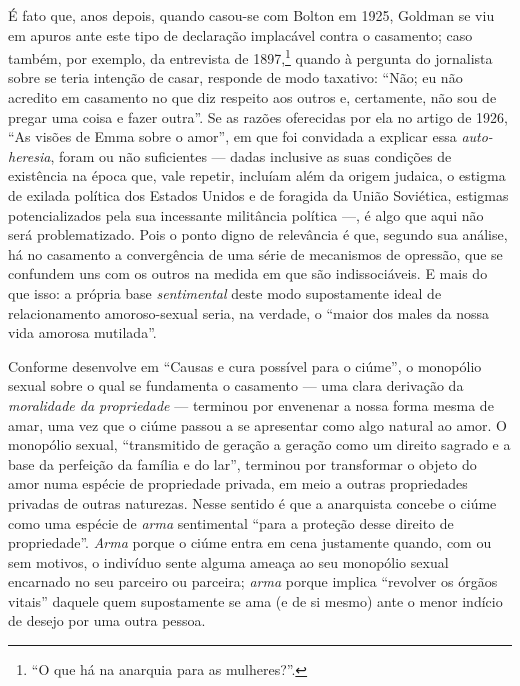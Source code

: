 É fato que, anos depois, quando casou-se com Bolton em 1925, Goldman
se viu em apuros ante este tipo de declaração implacável contra o
casamento; caso também, por exemplo, da entrevista de 1897,\footnote{``O que há
na anarquia para as mulheres?''.} quando à pergunta do jornalista sobre
se teria intenção de casar, responde de modo taxativo: ``Não; eu não
acredito em casamento no que diz respeito aos outros e, certamente, não
sou de pregar uma coisa e fazer outra''. Se as razões oferecidas por
ela no artigo de 1926, ``As visões de Emma sobre o amor'',
em que foi convidada a explicar essa \textit{auto-heresia}, foram ou não
suficientes --- dadas inclusive as suas condições de existência na época
que, vale repetir, incluíam além da origem judaica, o estigma de exilada
política dos Estados Unidos e de foragida da União Soviética,
estigmas potencializados pela sua incessante militância política ---, é
algo que aqui não será problematizado. Pois o ponto
digno de relevância é que, segundo sua análise, há no
casamento a convergência de uma série de mecanismos de opressão, que se
confundem uns com os outros na medida em que são indissociáveis. E mais
do que isso: a própria base \textit{sentimental} deste modo supostamente
ideal de relacionamento amoroso-sexual seria, na verdade, o ``maior dos
males da nossa vida amorosa mutilada''.

Conforme desenvolve em ``Causas e cura possível para o ciúme'', o
monopólio sexual sobre o qual se fundamenta o casamento --- uma clara
derivação da \textit{moralidade da propriedade} --- terminou por envenenar a
nossa forma mesma de amar, uma vez que o ciúme passou a se apresentar
como algo natural ao amor. O monopólio sexual, ``transmitido de
geração a geração como um direito sagrado e a base da perfeição da
família e do lar'', terminou por transformar o objeto do amor numa
espécie de propriedade privada, em meio a outras propriedades privadas
de outras naturezas. Nesse sentido é que a anarquista concebe o
ciúme como uma espécie de \textit{arma} sentimental ``para a proteção desse
direito de propriedade''.
\textit{Arma} porque o ciúme entra em cena
justamente quando, com ou sem motivos, o indivíduo sente alguma ameaça
ao seu monopólio sexual encarnado no seu parceiro ou parceira; \textit{arma}
porque implica ``revolver os órgãos vitais'' daquele quem supostamente
se ama (e de si mesmo) ante o menor indício de desejo por uma outra
pessoa.

